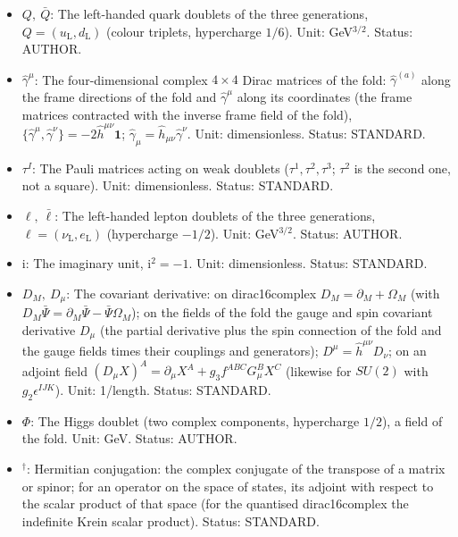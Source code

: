 \documentclass[
  10pt,
]{article}
\begin{document}
\begin{itemize}
  for \(X = \mathrm{R}\). Unit: dimensionless. Status: AUTHOR.
\item
  \(Q,\ \bar Q\): The left-handed quark doublets of the three
  generations, \(Q = (u_{\mathrm{L}}, d_{\mathrm{L}})\) (colour
  triplets, hypercharge \(1/6\)). Unit: GeV\(^{3/2}\). Status: AUTHOR.
\item
  \(\hat\gamma^\mu\): The four-dimensional complex \(4 \times 4\) Dirac
  matrices of the fold: \(\hat\gamma^{(a)}\) along the frame directions
  of the fold and \(\hat\gamma^\mu\) along its coordinates (the frame
  matrices contracted with the inverse frame field of the fold),
  \(\{\hat\gamma^\mu, \hat\gamma^\nu\} = -2\hat h^{\mu\nu}\mathbf{1}\);
  \(\hat\gamma_\mu = \hat h_{\mu\nu}\hat\gamma^\nu\). Unit:
  dimensionless. Status: STANDARD.
\item
  \(\tau^I\): The Pauli matrices acting on weak doublets
  (\(\tau^1, \tau^2, \tau^3\); \(\tau^2\) is the second one, not a
  square). Unit: dimensionless. Status: STANDARD.
\item
  \(\ell,\ \bar\ell\): The left-handed lepton doublets of the three
  generations, \(\ell = (\nu_{\mathrm{L}}, e_{\mathrm{L}})\)
  (hypercharge \(-1/2\)). Unit: GeV\(^{3/2}\). Status: AUTHOR.
\item
  \(\mathrm{i}\): The imaginary unit, \(\mathrm{i}^2 = -1\). Unit:
  dimensionless. Status: STANDARD.
\item
  \(D_M,\ D_\mu\): The covariant derivative: on dirac16complex
  \(D_M = \partial_M + \Omega_M\) (with
  \(D_M\bar\Psi = \partial_M\bar\Psi - \bar\Psi\Omega_M\)); on the
  fields of the fold the gauge and spin covariant derivative \(D_\mu\)
  (the partial derivative plus the spin connection of the fold and the
  gauge fields times their couplings and generators);
  \(D^\mu = \hat h^{\mu\nu}D_\nu\); on an adjoint field
  \((D_\mu X)^A = \partial_\mu X^A + g_3f^{ABC}G^B_\mu X^C\) (likewise
  for \(SU(2)\) with \(g_2\epsilon^{IJK}\)). Unit: 1/length. Status:
  STANDARD.
\item
  \(\Phi\): The Higgs doublet (two complex components, hypercharge
  \(1/2\)), a field of the fold. Unit: GeV. Status: AUTHOR.
\item
  \({}^\dagger\): Hermitian conjugation: the complex conjugate of the
  transpose of a matrix or spinor; for an operator on the space of
  states, its adjoint with respect to the scalar product of that space
  (for the quantised dirac16complex the indefinite Krein scalar
  product). Status: STANDARD.
\end{itemize}
\end{document}
